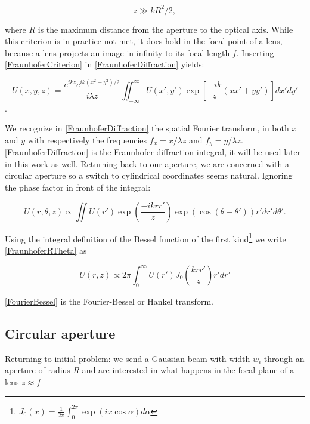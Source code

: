 \begin{equation}\label{FraunhoferCriterion}
    z \gg k R^2/2,
\end{equation}

where $R$ is the maximum distance from the aperture to the optical axis. While this criterion is in practice not met, it does hold in the focal point of a lens, because a lens projects an image in infinity to its focal length $f$. Inserting \cref{FraunhoferCriterion} in \cref{FraunhoferDiffraction} yields:

\begin{equation}\label{FraunhoferDiffraction}
    U(x, y, z)=\frac{e^{i k z} e^{i k\left(x^{2}+y^{2}\right)/2}}{i \lambda z} \iint_{-\infty}^{\infty} U(x', y') \exp \left[\frac{-ik}{z}(x x'+y y')\right] dx' dy'
\end{equation}. 

We recognize in \cref{FraunhoferDiffraction} the spatial Fourier transform, in both $x$ and $y$ with respectively the frequencies $f_x = x/\lambda z$ and $f_y = y/\lambda z$. \cref{FraunhoferDiffraction} is the Fraunhofer diffraction integral, it will be used later in this work as well. Returning back to our aperture, we are concerned with a circular aperture so a switch to cylindrical coordinates seems natural. Ignoring the phase factor in front of the integral:

\begin{equation}\label{FraunhoferRTheta}
    U(r,\theta, z) \propto \iint U(r') \exp{(\frac{- i k rr'}{z})} \exp{\left(\cos{(\theta-\theta')}\right)} r'dr'd\theta'.
\end{equation}

Using the integral definition of the Bessel function of the first kind\footnote{$J_0(x) = \frac{1}{2\pi} \int_0^{2\pi} \exp{(i x \cos{\alpha})} d\alpha$} we write \cref{FraunhoferRTheta} as 

\begin{equation}\label{FourierBessel}
    U(r,z) \propto 2\pi \int_0^{\infty} U(r') J_0\left( \frac{k r r'}{z}\right) r'dr'
\end{equation}

\cref{FourierBessel} is the Fourier-Bessel or Hankel transform. 

\subsection{Circular aperture}

Returning to initial problem: we send a Gaussian beam with width $w_i$ through an aperture of radius $R$ and are interested in what happens in the focal plane of a lens $z\approx f$

